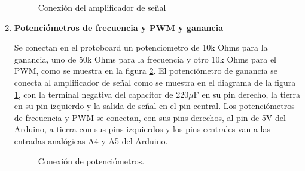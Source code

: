 \documentclass[11pt]{article}
\begin{document}
\begin{enumerate}[label=\textbf{Paso \arabic*:}]
\begin{figure}[htb]
\centering
{}
\caption{Conexión del amplificador de señal}
\label{fig:amp}
\end{figure}


\item \textbf{Potenciómetros de frecuencia y PWM y ganancia}

Se conectan en el protoboard un potenciometro de 10k Ohms para la ganancia, uno de 50k Ohms para la frecuencia y otro 10k Ohms para el PWM, como se muestra en la figura \ref{fig:POTs}. El potenciómetro de ganancia se conecta al amplificador de señal como se muestra en el diagrama de la figura \ref{fig:amp}, con la terminal negativa del capacitor de 220$\mu$F en su pin derecho, la tierra en su pin izquierdo y la salida de señal en el pin central. Los potenciómetros de frecuencia y PWM se conectan, con sus pins derechos, al pin de 5V del Arduino, a tierra con sus pins izquierdos y los pins centrales van a las entradas analógicas A4 y A5 del Arduino.


\begin{figure}[H]
\centering
{}
\caption{Conexión de potenciómetros.}
\label{fig:POTs}
\end{figure}



\end{enumerate}
\end{document}
